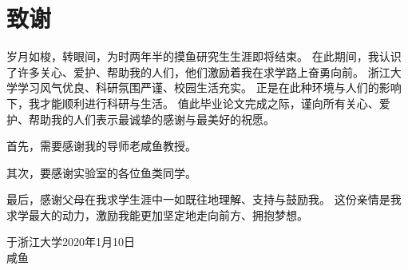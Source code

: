 
\ifanon
\else
\chapter{致\texorpdfstring{\ZJUspace}{}谢}
岁月如梭，转眼间，为时两年半的摸鱼研究生生涯即将结束。
在此期间，我认识了许多关心、爱护、帮助我的人们，他们激励着我在求学路上奋勇向前。
浙江大学学习风气优良、科研氛围严谨、校园生活充实。
正是在此种环境与人们的影响下，我才能顺利进行科研与生活。
值此毕业论文完成之际，谨向所有关心、爱护、帮助我的人们表示最诚挚的感谢与最美好的祝愿。

首先，需要感谢我的导师老咸鱼教授。

其次，要感谢实验室的各位鱼类同学。

最后，感谢父母在我求学生涯中一如既往地理解、支持与鼓励我。
这份亲情是我求学最大的动力，激励我能更加坚定地走向前方、拥抱梦想。

\vspace{2cm}
\hfill
\begin{minipage}{14em}
\begin{center}
于浙江大学\quad 2020年1月10日\\
咸鱼
\end{center}
\end{minipage}
\fi
